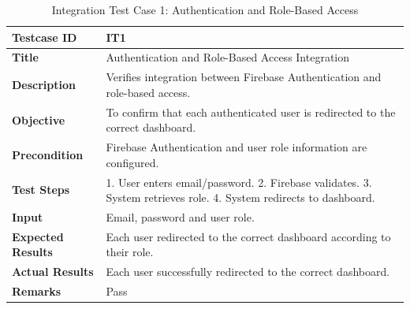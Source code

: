
\begin{table}[H]
\centering
\caption{Integration Test Case 1: Authentication and Role-Based Access}
\begin{tabularx}{\textwidth}{|l|X|}
\hline
\textbf{Testcase ID} & IT1 \\ \hline
\textbf{Title} & Authentication and Role-Based Access Integration \\ \hline
\textbf{Description} & Verifies integration between Firebase Authentication and role-based access. \\ \hline
\textbf{Objective} & To confirm that each authenticated user is redirected to the correct dashboard. \\ \hline
\textbf{Precondition} & Firebase Authentication and user role information are configured. \\ \hline
\textbf{Test Steps} & 1. User enters email/password. 2. Firebase validates. 3. System retrieves role. 4. System redirects to dashboard. \\ \hline
\textbf{Input} & Email, password and user role. \\ \hline
\textbf{Expected Results} & Each user redirected to the correct dashboard according to their role. \\ \hline
\textbf{Actual Results} & Each user successfully redirected to the correct dashboard. \\ \hline
\textbf{Remarks} & Pass \\ \hline
\end{tabularx}
\end{table}

